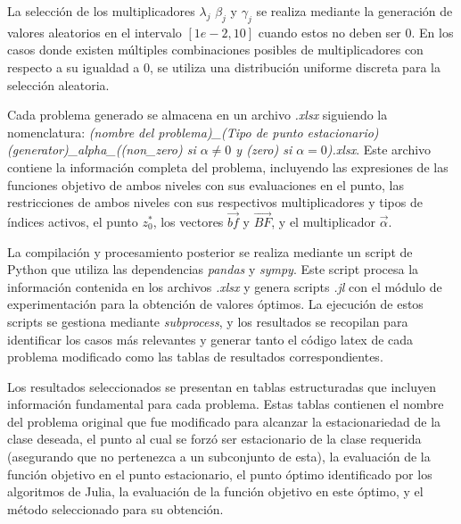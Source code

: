     La selección de los multiplicadores $\lambda_j$ $\beta_j$ y $\gamma_j$ se realiza mediante la generación de valores aleatorios en el intervalo $[1e-2, 10]$ cuando estos no deben ser $0$. En los casos donde existen múltiples combinaciones posibles de multiplicadores con respecto a su igualdad a $0$, se utiliza una distribución uniforme discreta para la selección aleatoria.
    
    Cada problema generado se almacena en un archivo \textit{.xlsx} siguiendo la nomenclatura: \textit{(nombre del problema)\_(Tipo de punto estacionario)(generator)\_alpha\_((non\_zero) si $\alpha \neq 0$ y (zero) si $\alpha = 0$).xlsx}. Este archivo contiene la información completa del problema, incluyendo las expresiones de las funciones objetivo de ambos niveles con sus evaluaciones en el punto, las restricciones de ambos niveles con sus respectivos multiplicadores y tipos de índices activos, el punto $z^*_0$, los vectores $\vec{bf}$ y $\vec{BF}$, y el multiplicador $\vec{\alpha}$.
    
    La compilación y procesamiento posterior se realiza mediante un script de Python que utiliza las dependencias \textit{pandas} y \textit{sympy}. Este script procesa la información contenida en los archivos \textit{.xlsx} y genera scripts \textit{.jl} con el módulo de experimentación para la obtención de valores óptimos. La ejecución de estos scripts se gestiona mediante \textit{subprocess}, y los resultados se recopilan para identificar los casos más relevantes y generar tanto el código latex de cada problema modificado como las tablas de resultados correspondientes.
    
    
    
    
    Los resultados seleccionados se presentan en tablas estructuradas que incluyen información fundamental para cada problema. Estas tablas contienen el nombre del problema original que fue modificado para alcanzar la estacionariedad de la clase deseada, el punto al cual se forzó ser estacionario de la clase requerida (asegurando que no pertenezca a un subconjunto de esta), la evaluación de la función objetivo en el punto estacionario, el punto óptimo identificado por los algoritmos de Julia, la evaluación de la función objetivo en este óptimo, y el método seleccionado para su obtención.

